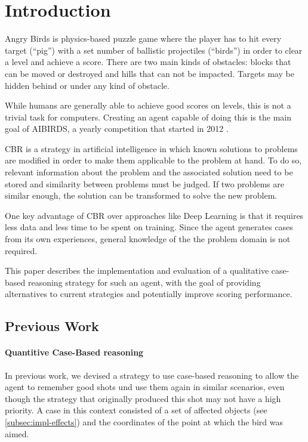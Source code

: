 \section{Introduction}\label{sec:intro}

Angry Birds is physics-based puzzle game where the player has to hit every target (``pig'') with a set number of ballistic projectiles (``birds'') in order to clear a level and achieve a score.
There are two main kinds of obstacles: blocks that can be moved or destroyed and hills that can not be impacted. Targets may be hidden behind or under any kind of obstacle.

While humans are generally able to achieve good scores on levels, this is not a trivial task for computers.
Creating an agent capable of doing this is the main goal of AIBIRDS, a yearly competition that started in 2012 \cite{Renz2015AIBIRDSTA}.

\ac{CBR} is a strategy in artificial intelligence in which known solutions to problems are modified in order to make them applicable to the problem at hand.
To do so, relevant information about the problem and the associated solution need to be stored and similarity between problems must be judged.
If two problems are similar enough, the solution can be transformed to solve the new problem.

One key advantage of \ac{CBR} over approaches like Deep Learning is that it requires less data and less time to be spent on training. Since the agent generates cases from its own experiences, general knowledge of the the problem domain is not required.\cite{CBR-issues-variations-approaches}

This paper describes the implementation and evaluation of a qualitative case-based reasoning strategy for such an agent, with the goal of providing alternatives to current strategies and potentially improve scoring performance.


\subsection{Previous Work}
\paragraph{Quantitive Case-Based reasoning}\label{par:quantititve-cbr}
In previous work, we devised a strategy to use case-based reasoning to allow the agent to remember good shots und use them again in similar scenarios, even though the strategy that originally produced this shot may not have a high priority.
A case in this context consisted of a set of affected objects (see \ref{subsec:impl-effects}) and the coordinates of the point at which the bird was aimed.

